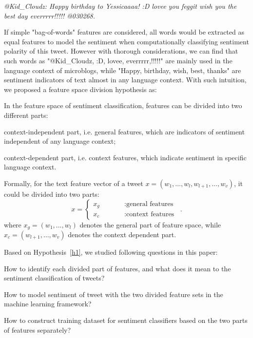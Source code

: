 \documentclass{llncs}
\begin{document}
\textit{@Kid\_Cloudz: Happy birthday to Yessicaaaa! :D lovee you feggit wish you the best day everrrrr!!!!! @030268.}

If simple "bag-of-words" features are considered, all words would be extracted as equal features to model the sentiment when computationally classifying sentiment polarity of this tweet. 
However with thorough considerations, we can find that such words as "@Kid\_Cloudz, :D, lovee, everrrrr,!!!!!" are mainly used in the  language context of microblogs, while "Happy, birthday, wish, best, thanks" are sentiment indicators of text almost in any language context. 
With such intuition, we proposed a feature space division hypothesis as:
\begin{hypothesis}
\label{h1}
In the feature space of sentiment classification, features can be divided into two different parts:
\begin{itemize*}
\item context-independent part, i.e. general features, which are indicators of sentiment independent of any language context;
\item context-dependent part, i.e. context features, which indicate sentiment in specific language context.
\end{itemize*}
\end{hypothesis}
Formally, for the text feature vector of a tweet $ x=\left(  w_{1},\dots,w_{l},w_{l+1},\dots,w_{v} \right) $, it could be divided into two parts:
\begin{equation}
\label{e2}
x=\left\{
\begin{array}{rcl}
x_{g}     & \qquad        &:\mbox{general features}\\
x_{c}     &  \qquad       &:\mbox{context features}
\end{array}
\right. \enspace .
\end{equation}
where $ x_{g}= \left( w_{1},\dots,w_{l}\right) $ denotes the general part of feature space, while $ x_{c}= \left( w_{l+1},\dots,w_{v}\right) $ denotes the context dependent part.

Based on Hypothesis~\ref{h1}, we studied following questions in this paper:
\begin{itemize*}
\item How to identify each divided part of features, and what does it mean to the 
sentiment classification of tweets? 
\item How to model sentiment of tweet with the two divided feature sets in 
the machine learning framework?
\item How to construct training dataset for sentiment classifiers based on 
the two parts of features separately?
\end{itemize*}
\end{document}
